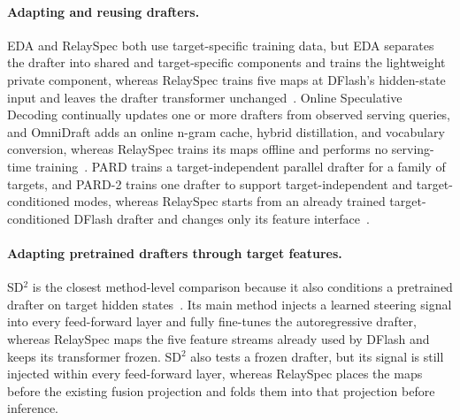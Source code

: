 \paragraph{Adapting and reusing drafters.}
EDA and RelaySpec both use target-specific training data, but EDA separates the drafter into shared and target-specific components and trains the lightweight private component, whereas RelaySpec trains five maps at DFlash's hidden-state input and leaves the drafter transformer unchanged~\citep{lin2026eda}. Online Speculative Decoding continually updates one or more drafters from observed serving queries, and OmniDraft adds an online n-gram cache, hybrid distillation, and vocabulary conversion, whereas RelaySpec trains its maps offline and performs no serving-time training~\citep{liu2024online,ramakrishnan2025omnidraft}. PARD trains a target-independent parallel drafter for a family of targets, and PARD-2 trains one drafter to support target-independent and target-conditioned modes, whereas RelaySpec starts from an already trained target-conditioned DFlash drafter and changes only its feature interface~\citep{an2026pard,an2026pard2}.

\paragraph{Adapting pretrained drafters through target features.}
SD$^2$ is the closest method-level comparison because it also conditions a pretrained drafter on target hidden states~\citep{berdoz2026steering}. Its main method injects a learned steering signal into every feed-forward layer and fully fine-tunes the autoregressive drafter, whereas RelaySpec maps the five feature streams already used by DFlash and keeps its transformer frozen. SD$^2$ also tests a frozen drafter, but its signal is still injected within every feed-forward layer, whereas RelaySpec places the maps before the existing fusion projection and folds them into that projection before inference.
